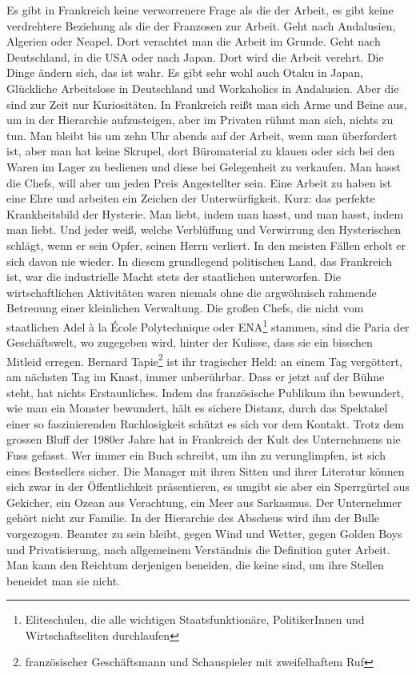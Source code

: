 
Es gibt in Frankreich keine verworrenere Frage als die der Arbeit,
es gibt keine verdrehtere Beziehung als die der Franzosen zur
Arbeit. Geht nach Andalusien, Algerien oder Neapel. Dort verachtet
man die Arbeit im Grunde. Geht nach Deutschland, in die USA oder
nach Japan. Dort wird die Arbeit verehrt. Die Dinge ändern sich,
das ist wahr. Es gibt sehr wohl auch Otaku in Japan, Glückliche
Arbeitslose in Deutschland und Workaholics in Andalusien. Aber die
sind zur Zeit nur Kuriositäten. In Frankreich reißt man sich Arme
und Beine aus, um in der Hierarchie aufzusteigen, aber im Privaten
rühmt man sich, nichts zu tun. Man bleibt bis um zehn Uhr abends
auf der Arbeit, wenn man überfordert ist, aber man hat keine
Skrupel, dort Büromaterial zu klauen oder sich bei den Waren im
Lager zu bedienen und diese bei Gelegenheit zu verkaufen. Man hasst
die Chefs, will aber um jeden Preis Angestellter sein. Eine Arbeit
zu haben ist eine Ehre und arbeiten ein Zeichen der
Unterwürfigkeit. Kurz: das perfekte Krankheitsbild der Hysterie.
Man liebt, indem man hasst, und man hasst, indem man liebt. Und
jeder weiß, welche Verblüffung und Verwirrung den Hysterischen
schlägt, wenn er sein Opfer, seinen Herrn verliert. In den meisten
Fällen erholt er sich davon nie wieder.
In diesem grundlegend politischen Land, das Frankreich ist, war die
industrielle Macht stets der staatlichen unterworfen. Die
wirtschaftlichen Aktivitäten waren niemals ohne die argwöhnisch
rahmende Betreuung einer kleinlichen Verwaltung. Die großen Chefs,
die nicht vom staatlichen Adel à la École Polytechnique oder ENA\footnote{
Eliteschulen, die alle wichtigen Staatsfunktionäre,
PolitikerInnen und Wirtschaftseliten durchlaufen
}
stammen, sind die Paria der Geschäftswelt, wo zugegeben wird,
hinter der Kulisse, dass sie ein bisschen Mitleid erregen. Bernard
Tapie\footnote{
französischer Geschäftsmann und Schauspieler mit zweifelhaftem
Ruf
}
ist ihr tragischer Held: an einem Tag vergöttert, am
nächsten Tag im Knast, immer unberührbar. Dass er jetzt auf der
Bühne steht, hat nichts Erstaunliches. Indem das französische
Publikum ihn bewundert, wie man ein Monster bewundert, hält es
sichere Distanz, durch das Spektakel einer so faszinierenden
Ruchlosigkeit schützt es sich vor dem Kontakt. Trotz dem grossen
Bluff der 1980er Jahre hat in Frankreich der Kult des Unternehmens
nie Fuss gefasst. Wer immer ein Buch schreibt, um ihn zu
verunglimpfen, ist sich eines Bestsellers sicher. Die Manager mit
ihren Sitten und ihrer Literatur können sich zwar in der
Öffentlichkeit präsentieren, es umgibt sie aber ein Sperrgürtel aus
Gekicher, ein Ozean aus Verachtung, ein Meer aus Sarkasmus. Der
Unternehmer gehört nicht zur Familie. In der Hierarchie des
Abscheus wird ihm der Bulle vorgezogen. Beamter zu sein bleibt,
gegen Wind und Wetter, gegen Golden Boys und Privatisierung, nach
allgemeinem Verständnis die Definition guter Arbeit. Man kann den
Reichtum derjenigen beneiden, die keine sind, um ihre Stellen
beneidet man sie nicht.

